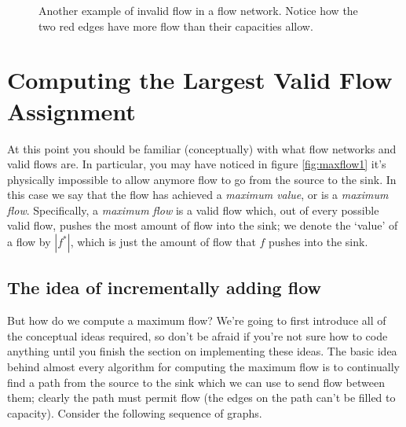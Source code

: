 \documentclass[11pt]{article}
\theoremstyle{plain}
\theoremstyle{definition}
\begin{document}
\begin{figure}[!ht]
\caption{Another example of invalid flow in a flow network. Notice how the two red edges have more flow than their capacities allow.}
\centering
{}
\end{figure}
\section{Computing the Largest Valid Flow Assignment}
At this point you should be familiar (conceptually) with what flow networks and valid flows are. In particular, you may have noticed in figure \ref{fig:maxflow1} it's physically impossible to allow anymore flow to go from the source to the sink. In this case we say that the flow has achieved a \emph{maximum value}, or is a \emph{maximum flow}. Specifically, a \emph{maximum flow} is a valid flow which, out of every possible valid flow, pushes the most amount of flow into the sink; we denote the `value' of a flow by $|f^*|$, which is just the amount of flow that $f$ pushes into the sink. 
\subsection{The idea of incrementally adding flow}
But how do we compute a maximum flow? We're going to first introduce all of the conceptual ideas required, so don't be afraid if you're not sure how to code anything until you finish the section on implementing these ideas. The basic idea behind almost every algorithm for computing the maximum flow is to continually find a path from the source to the sink which we can use to send flow between them; clearly the path must permit flow (the edges on the path can't be filled to capacity). Consider the following sequence of graphs.
\end{document}
